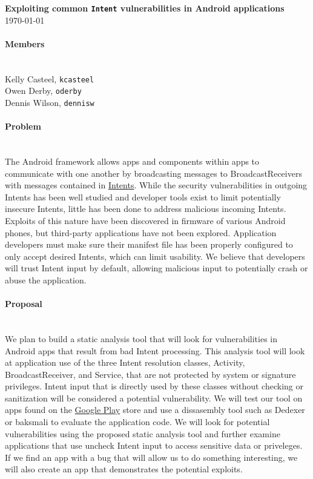 \documentclass[12pt,a4paper,draft]{article}
\begin{document}


\flushleft\textbf{Exploiting common \texttt{Intent} vulnerabilities in Android %
applications}\\
\today\\

\paragraph{Members} ~\\

Kelly Casteel, \texttt{kcasteel}\\
Owen Derby, \texttt{oderby}\\
Dennis Wilson, \texttt{dennisw}\\

\paragraph{Problem} ~\\
The Android framework allows apps and components within apps to communicate with one another by broadcasting messages to BroadcastReceivers with messages contained in \href{https://developer.android.com/reference/android/content/Intent.html}{Intents}. While the security vulnerabilities in outgoing Intents has been well studied\cite{chin_analayzing_2011} and developer tools exist to limit potentially insecure Intents, little has been done to address malicious incoming Intents. Exploits of this nature have been discovered in firmware of various Android phones\cite{grace_systematic_2012}, but third-party applications have not been explored. Application developers must make sure their manifest file has been properly configured to only accept desired Intents, which can limit usability. We believe that developers will trust Intent input by default, allowing malicious input to potentially crash or abuse the application. 

\paragraph{Proposal} ~\\
We plan to build a static analysis tool that will look for vulnerabilities in Android apps that result from bad Intent processing. This analysis tool will look at application use of the three Intent resolution classes, Activity, BroadcastReceiver, and Service, that are not protected by system or signature privileges. Intent input that is directly used by these classes without checking or sanitization will be considered a potential vulnerability. We will test our tool on apps found on the \href{https://play.google.com/store/apps}{Google Play} store and use a dissasembly tool such as Dedexer\cite{dedexer} or baksmali\cite{baksmali} to evaluate the application code. We will look for potential vulnerabilities using the proposed static analysis tool and further examine applications that use uncheck Intent input to access sensitive data or priveleges. If we find an app with a bug that will allow us to do something interesting, we will also create an app that demonstrates the potential exploits.


\end{document}

